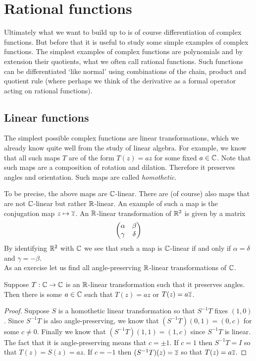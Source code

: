 \section{Rational functions}
Ultimately what we want to build up to is of course differentiation of complex functions. But before that it is useful to study some simple examples of complex functions. The simplest examples of complex functions are polynomials and by extension their quotients, what we often call rational functions. Such functions can be differentiated `like normal' using combinations of the chain, product and quotient rule (where perhaps we think of the derivative as a formal operator acting on rational functions). 
\subsection{Linear functions}
The simplest possible complex functions are linear transformations, which we already know quite well from the study of linear algebra. For example, we know that all such maps $T$ are of the form $T(z) = az$ for some fixed $a \in \mathbb{C}$. Note that such maps are a composition of rotation and dilation. Therefore it preserves angles and orientation. Such maps are called \textit{homothetic}. 

To be precise, the above maps are $\mathbb{C}$-linear. There are (of course) also maps that are not $\mathbb{C}$-linear but rather $\mathbb{R}$-linear. An example of such a map is the conjugation map $z \mapsto \overline{z}$. An $\mathbb{R}$-linear transformation of $\mathbb{R}^2$ is given by a matrix
$$ \begin{pmatrix} \alpha & \beta \\ \gamma & \delta \end{pmatrix} $$
By identifying $\mathbb{R}^2$ with $\mathbb{C}$ we see that such a map is $\mathbb{C}$-linear if and only if $\alpha = \delta$ and $\gamma = -\beta$.\\

As an exercise let us find all angle-preserving $\mathbb{R}$-linear transformations of $\mathbb{C}$.
\begin{proposition}\label{prop:linear-trans}
Suppose $T: \mathbb{C} \to \mathbb{C}$ is an $\mathbb{R}$-linear transformation such that it preserves angles. Then there is some $a \in \mathbb{C}$ such that $T(z) = az$ or $T(z) = a \overline{z}$. 
\end{proposition}
\begin{proof}
Suppose $S$ is a homothetic linear transformation so that $S^{-1} T$ fixes $(1, 0)$. Since $S^{-1} T$ is also angle-preserving, we know that $(S^{-1} T)(0, 1) = (0, c)$ for some $c \neq 0$. Finally we know that $(S^{-1} T) (1, 1) = (1, c)$ since $S^{-1} T$ is linear. The fact that it is angle-preserving means that $c = \pm 1$. If $c = 1$ then $S^{-1} T = I$ so that $T(z) = S(z) = az$. If $c = -1$ then $(S^{-1} T)(z) = \overline{z}$ so that $T(z) = a \overline{z}$. 
\end{proof}

